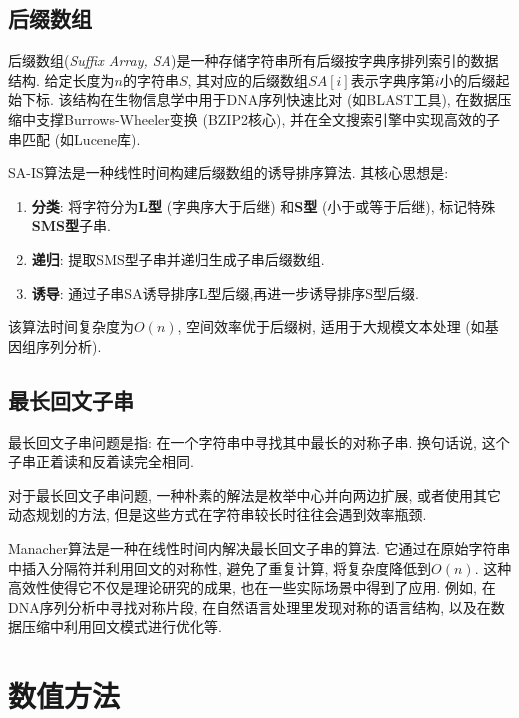 \documentclass[a4paper]{ctexbook}
\begin{document}


\section{后缀数组}

后缀数组(\textit{Suffix Array, SA})是一种存储字符串所有后缀按字典序排列索引的数据结构. 给定长度为$n$的字符串$S$, 其对应的后缀数组$SA[i]$表示字典序第$i$小的后缀起始下标. 该结构在生物信息学中用于DNA序列快速比对 (如BLAST工具), 在数据压缩中支撑Burrows-Wheeler变换 (BZIP2核心), 并在全文搜索引擎中实现高效的子串匹配 (如Lucene库).

SA-IS算法是一种线性时间构建后缀数组的诱导排序算法. 其核心思想是:
\begin{enumerate}
  \item \textbf{分类}: 将字符分为\textbf{L型} (字典序大于后继) 和\textbf{S型} (小于或等于后继), 标记特殊\textbf{SMS型}子串.
	\item \textbf{递归}: 提取SMS型子串并递归生成子串后缀数组.
	\item \textbf{诱导}: 通过子串SA诱导排序L型后缀,再进一步诱导排序S型后缀.
\end{enumerate}
该算法时间复杂度为$O(n)$, 空间效率优于后缀树, 适用于大规模文本处理 (如基因组序列分析).



\section{最长回文子串}

最长回文子串问题是指: 在一个字符串中寻找其中最长的对称子串. 换句话说, 这个子串正着读和反着读完全相同.

对于最长回文子串问题, 一种朴素的解法是枚举中心并向两边扩展, 或者使用其它动态规划的方法, 但是这些方式在字符串较长时往往会遇到效率瓶颈.

Manacher算法是一种在线性时间内解决最长回文子串的算法. 它通过在原始字符串中插入分隔符并利用回文的对称性, 避免了重复计算, 将复杂度降低到$O(n)$. 这种高效性使得它不仅是理论研究的成果, 也在一些实际场景中得到了应用. 例如, 在DNA序列分析中寻找对称片段, 在自然语言处理里发现对称的语言结构, 以及在数据压缩中利用回文模式进行优化等.



\chapter{数值方法}
\end{document}
